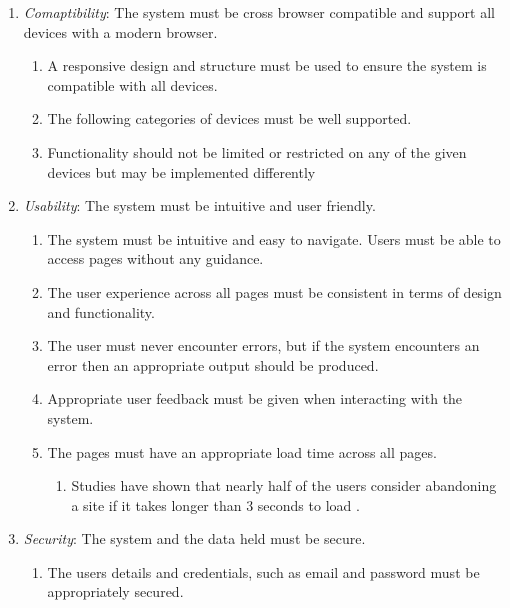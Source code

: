 \begin{enumerate}[label=\textbf{NF\arabic*}]
\item \textit{Comaptibility}: The system must be cross browser compatible and support all devices with a modern browser.
	\begin{enumerate}[leftmargin=0.75in]
		\item A responsive design and structure must be used to ensure the system is compatible with all devices.
		\item The following categories of devices must be well supported.
		\item Functionality should not be limited or restricted on any of the given devices but may be implemented differently
	\end{enumerate}
\item \textit{Usability}: The system must be intuitive and user friendly.
	\begin{enumerate}[leftmargin=0.75in]
		\item The system must be intuitive and easy to navigate. Users must be able to access pages without any guidance.
		\item The user experience across all pages must be consistent in terms of design and functionality.
		\item The user must never encounter errors, but if the system encounters an error then an appropriate output should be produced.
		\item Appropriate user feedback must be given when interacting with the system.
		\item The pages must have an appropriate load time across all pages.
		\begin{enumerate}
			\item Studies have shown that nearly half of the users consider abandoning a site if it takes longer than 3 seconds to load \cite{Kissmetrics:Speed}.
		\end{enumerate}
	\end{enumerate}
\item \textit{Security}: The system and the data held must be secure.
	\begin{enumerate}[leftmargin=0.75in]
		\item The users details and credentials, such as email and password must be appropriately secured.

\end{enumerate}
\end{enumerate}
